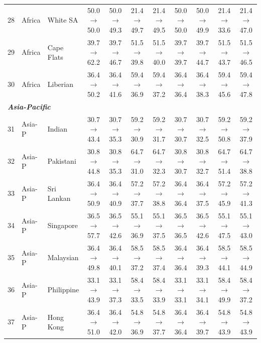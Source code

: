 \begin{table}[t]
{\begin{tabular}{rll c c c c c c c c}
28 & Africa & White SA & 50.0$\rightarrow$50.0 & 50.0$\rightarrow$49.3 & 21.4$\rightarrow$49.7 & 21.4$\rightarrow$49.5 & 50.0$\rightarrow$50.0 & 50.0$\rightarrow$49.9 & 21.4$\rightarrow$33.6 & 21.4$\rightarrow$47.0 \\
29 & Africa & Cape Flats & 39.7$\rightarrow$62.2 & 39.7$\rightarrow$46.7 & 51.5$\rightarrow$39.8 & 51.5$\rightarrow$40.0 & 39.7$\rightarrow$39.7 & 39.7$\rightarrow$44.7 & 51.5$\rightarrow$43.7 & 51.5$\rightarrow$46.5 \\
30 & Africa & Liberian & 36.4$\rightarrow$50.2 & 36.4$\rightarrow$41.6 & 59.4$\rightarrow$36.9 & 59.4$\rightarrow$37.2 & 36.4$\rightarrow$36.4 & 36.4$\rightarrow$38.3 & 59.4$\rightarrow$45.6 & 59.4$\rightarrow$47.8 \\
\midrule
\multicolumn{11}{l}{\textit{\textbf{Asia-Pacific}}} \\
31 & Asia-P & Indian & 30.7$\rightarrow$43.4 & 30.7$\rightarrow$35.3 & 59.2$\rightarrow$30.9 & 59.2$\rightarrow$31.7 & 30.7$\rightarrow$30.7 & 30.7$\rightarrow$32.5 & 59.2$\rightarrow$50.8 & 59.2$\rightarrow$37.9 \\
32 & Asia-P & Pakistani & 30.8$\rightarrow$44.8 & 30.8$\rightarrow$35.3 & 64.7$\rightarrow$31.0 & 64.7$\rightarrow$32.3 & 30.8$\rightarrow$30.7 & 30.8$\rightarrow$32.7 & 64.7$\rightarrow$51.4 & 64.7$\rightarrow$38.8 \\
33 & Asia-P & Sri Lankan & 36.4$\rightarrow$50.9 & 36.4$\rightarrow$40.9 & 57.2$\rightarrow$37.7 & 57.2$\rightarrow$38.8 & 36.4$\rightarrow$36.4 & 36.4$\rightarrow$37.5 & 57.2$\rightarrow$45.9 & 57.2$\rightarrow$41.3 \\
34 & Asia-P & Singapore & 36.5$\rightarrow$57.7 & 36.5$\rightarrow$42.6 & 55.1$\rightarrow$36.9 & 55.1$\rightarrow$37.5 & 36.5$\rightarrow$36.5 & 36.5$\rightarrow$42.6 & 55.1$\rightarrow$47.5 & 55.1$\rightarrow$43.0 \\
35 & Asia-P & Malaysian & 36.4$\rightarrow$49.8 & 36.4$\rightarrow$40.1 & 58.5$\rightarrow$37.2 & 58.5$\rightarrow$37.4 & 36.4$\rightarrow$36.4 & 36.4$\rightarrow$39.3 & 58.5$\rightarrow$44.1 & 58.5$\rightarrow$44.9 \\
36 & Asia-P & Philippine & 33.1$\rightarrow$43.9 & 33.1$\rightarrow$37.3 & 58.4$\rightarrow$33.5 & 58.4$\rightarrow$33.9 & 33.1$\rightarrow$33.1 & 33.1$\rightarrow$34.1 & 58.4$\rightarrow$49.9 & 58.4$\rightarrow$37.2 \\
37 & Asia-P & Hong Kong & 36.4$\rightarrow$51.0 & 36.4$\rightarrow$42.0 & 54.8$\rightarrow$36.9 & 54.8$\rightarrow$37.7 & 36.4$\rightarrow$36.4 & 36.4$\rightarrow$39.7 & 54.8$\rightarrow$43.9 & 54.8$\rightarrow$43.9 \\

\end{tabular}}
\end{table}
